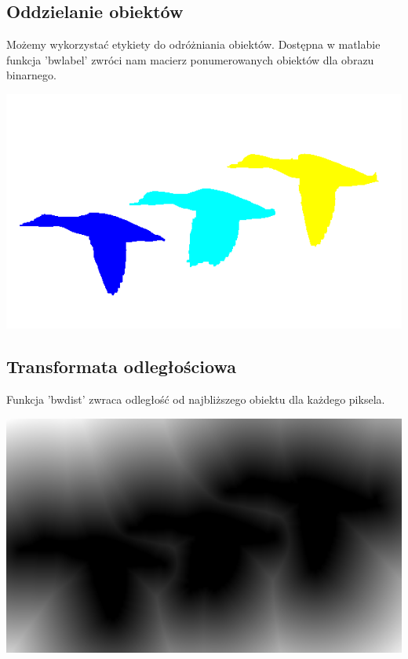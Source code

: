 \documentclass{article}
\begin{document}
	\subsection{Oddzielanie obiektów}
	Możemy wykorzystać etykiety do odróżniania obiektów. Dostępna w matlabie funkcja 'bwlabel' zwróci nam macierz ponumerowanych obiektów dla obrazu binarnego.
	\begin{center}
		\includegraphics[width=\linewidth]{../../lab05/kaczki_color_label.png}
	\end{center}

	\subsection{Transformata odległościowa}
	Funkcja 'bwdist' zwraca odległość od najbliższego obiektu dla każdego piksela.
	\begin{center}
		\includegraphics[width=\linewidth]{../../lab05/kaczki_distance.png}
		\label{fig:kaczki_dist}
	\end{center}
	
\end{document}

